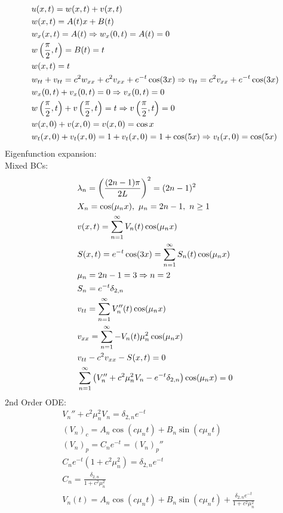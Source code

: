 \documentclass[11pt, fleqn]{article}
\begin{document}
\begin{align*}
    &u(x,t)=w(x,t)+v(x,t)\\
    &w(x,t)=A(t)x+B(t)\\
    &w_x(x,t)=A(t)\Rightarrow w_x(0,t)=A(t)=0\\
    &w\left( \frac{\pi}{2},t \right)=B(t)=t\\
    &w(x,t)=t\\
    &w_{tt}+v_{tt}=c^2w_{xx}+c^2v_{xx}+e^{-t}\cos(3x)\Rightarrow v_{tt}=c^2v_{xx}+e^{-t}\cos(3x)\\
    &w_x(0,t)+v_x(0,t)=0\Rightarrow v_x(0,t)=0\\
    &w\left( \frac{\pi}{2},t \right)+v\left( \frac{\pi}{2},t \right)=t\Rightarrow v\left( \frac{\pi}{2},t \right)=0\\
    &w(x,0)+v(x,0)=v(x,0)=\cos x\\
    &w_t(x,0)+v_t(x,0)=1+v_t(x,0)=1+\cos(5x)\Rightarrow v_t(x,0)=\cos(5x)
\end{align*}
Eigenfunction expansion:\\
Mixed BCs:
\begin{align*}
    &\lambda_n=\left( \frac{(2n-1)\pi}{2L} \right)^2=(2n-1)^2\\
    &X_n=\cos(\mu_nx),\ \mu_n=2n-1,\ n\geq1\\
    &v(x,t)=\sum_{n=1}^\infty V_n(t)\cos(\mu_nx)\\
    &S(x,t)=e^{-t}\cos(3x)=\sum_{n=1}^\infty S_n(t)\cos(\mu_n x)\\
    &\mu_n=2n-1=3\Rightarrow n=2\\
    &S_n=e^{-t}\delta_{2,n}\\
    &v_{tt}=\sum_{n=1}^\infty V_n''(t)\cos(\mu_nx)\\
    &v_{xx}=\sum_{n=1}^\infty-V_n(t)\mu_n^2\cos(\mu_nx)\\
    &v_{tt}-c^2v_{xx}-S(x,t)=0\\
    &\sum_{n=1}^\infty\left( V_n''+c^2\mu_n^2V_n-e^{-t}\delta_{2,n} \right)\cos(\mu_nx)=0
\end{align*}
2nd Order ODE:
\begin{align*}
    &V_n''+c^2\mu_n^2V_n=\delta_{2,n}e^{-t}\\
    &(V_n)_c=A_n\cos(c\mu_nt)+B_n\sin(c\mu_nt)\\
    &(V_n)_p=C_ne^{-t}= (V_n)_p''\\
    &C_ne^{-t}(1+c^2\mu_n^2)=\delta_{2,n}e^{-t}\\
    &C_n=\frac{\delta_{2,n}}{1+c^2\mu_n^2}\\
    &V_n(t)=A_n\cos(c\mu_nt)+B_n\sin(c\mu_nt)+\frac{\delta_{2,n}e^{-t}}{1+c^2\mu_n^2}
\end{align*}
\end{document}
